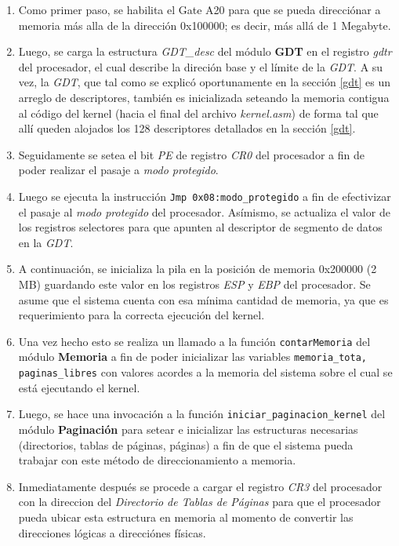 \documentclass[11pt, a4paper]{article}
\begin{document}
	\begin{enumerate}
		\item Como primer paso, se habilita el Gate A20 para que se pueda direcciónar a memoria más alla de la dirección 0x100000; es decir, más allá de 1 Megabyte.
		\item Luego, se carga la estructura \textit{GDT\_desc} del módulo \textbf{GDT} en el registro \textit{gdtr} del procesador, el cual describe la direción base y el límite de la \textit{GDT}. A su vez, la \textit{GDT}, que tal como se explicó oportunamente en la sección \ref{gdt} es un arreglo de descriptores, también es inicializada seteando la memoria contigua al código del kernel (hacia el final del archivo \textit{kernel.asm}) de forma tal que allí queden alojados los 128 descriptores detallados en la sección \ref{gdt}. 
		\item Seguidamente se setea el bit \textit{PE} de registro \textit{CR0} del procesador a fin de poder realizar el pasaje a \textit{modo protegido}.
		\item Luego se ejecuta la instrucción \texttt{Jmp 0x08:modo\_protegido} a fin de efectivizar el pasaje al \textit{modo protegido} del procesador. Asímismo, se actualiza el valor de los registros selectores para que apunten al descriptor de segmento de datos en la \textit{GDT}.
		\item A continuación, se inicializa la pila en la posición de memoria 0x200000 (2 MB) guardando este valor en los registros \textit{ESP} y \textit{EBP} del procesador. Se asume que el sistema cuenta con esa mínima cantidad de memoria, ya que es requerimiento para la correcta ejecución del kernel.
		\item Una vez hecho esto se realiza un llamado a la función \texttt{contarMemoria} del módulo \textbf{Memoria} a fin de poder inicializar las variables \texttt{memoria\_tota, paginas\_libres} con valores acordes a la memoria del sistema sobre el cual se está ejecutando el kernel.
		\item Luego, se hace una invocación a la función \texttt{iniciar\_paginacion\_kernel} del módulo \textbf{Paginación} para setear e inicializar las estructuras necesarias (directorios, tablas de páginas, páginas) a fin de que el sistema pueda trabajar con este método de direccionamiento a memoria.
		\item Inmediatamente después se procede a cargar el registro \textit{CR3} del procesador con la direccion del \textit{Directorio de Tablas de Páginas} para que el procesador pueda ubicar esta estructura en memoria al momento de convertir las direcciones lógicas a direcciónes físicas.

\end{enumerate}
\end{document}
